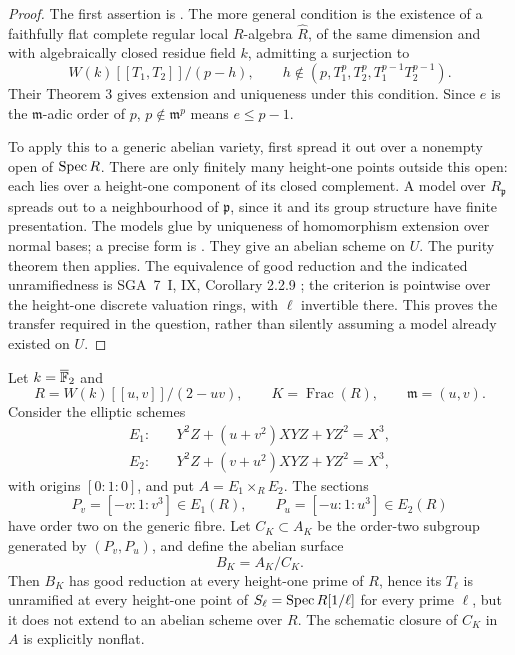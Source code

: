 \begin{proof}
The first assertion is \citet[Corollary 4]{c_vasiuzink2010}. The more general condition is the existence of a faithfully flat complete regular local $R$-algebra $\widehat R$, of the same dimension and with algebraically closed residue field $k$, admitting a surjection to
\[
 W(k)[[T_1,T_2]]/(p-h),\qquad
 h\notin(p,T_1^p,T_2^p,T_1^{p-1}T_2^{p-1}).
\]
Their Theorem 3 gives extension and uniqueness under this condition. Since $e$ is the $\mathfrak m$-adic order of $p$, $p\notin\mathfrak m^p$ means $e\leq p-1$.

To apply this to a generic abelian variety, first spread it out over a nonempty open of $\operatorname{Spec} R$. There are only finitely many height-one points outside this open: each lies over a height-one component of its closed complement. A model over $R_{\mathfrak p}$ spreads out to a neighbourhood of $\mathfrak p$, since it and its group structure have finite presentation. The models glue by uniqueness of homomorphism extension over normal bases; a precise form is \citet[Proposition 3.3.1.5]{c_lan2021}. They give an abelian scheme on $U$. The purity theorem then applies. The equivalence of good reduction and the indicated unramifiedness is SGA~7~I, IX, Corollary 2.2.9 \citep{c_sga7}; the criterion is pointwise over the height-one discrete valuation rings, with $\ell$ invertible there. This proves the transfer required in the question, rather than silently assuming a model already existed on $U$.
\end{proof}

\begin{theorem}[An explicit abelian-surface counterexample at $p=2$]
\label{c:explicit-bad-reduction}
Let $k=\overline{\mathbb F}_2$ and
\[
 R=W(k)[[u,v]]/(2-uv),\qquad K=\operatorname{Frac}(R),\qquad
 \mathfrak m=(u,v).
\]
Consider the elliptic schemes
\begin{align*}
 E_1:&\quad Y^2Z+(u+v^2)XYZ+YZ^2=X^3,\\
 E_2:&\quad Y^2Z+(v+u^2)XYZ+YZ^2=X^3,
\end{align*}
with origins $[0:1:0]$, and put $A=E_1\times_R E_2$. The sections
\[
 P_v=[-v:1:v^3]\in E_1(R),\qquad
 P_u=[-u:1:u^3]\in E_2(R)
\]
have order two on the generic fibre. Let $C_K\subset A_K$ be the order-two subgroup generated by $(P_v,P_u)$, and define the abelian surface
\[
 B_K=A_K/C_K.
\]
Then $B_K$ has good reduction at every height-one prime of $R$, hence its $T_\ell$ is unramified at every height-one point of $S_\ell=\operatorname{Spec} R[1/\ell]$ for every prime $\ell$, but it does not extend to an abelian scheme over $R$. The schematic closure of $C_K$ in $A$ is explicitly nonflat.
\end{theorem}

